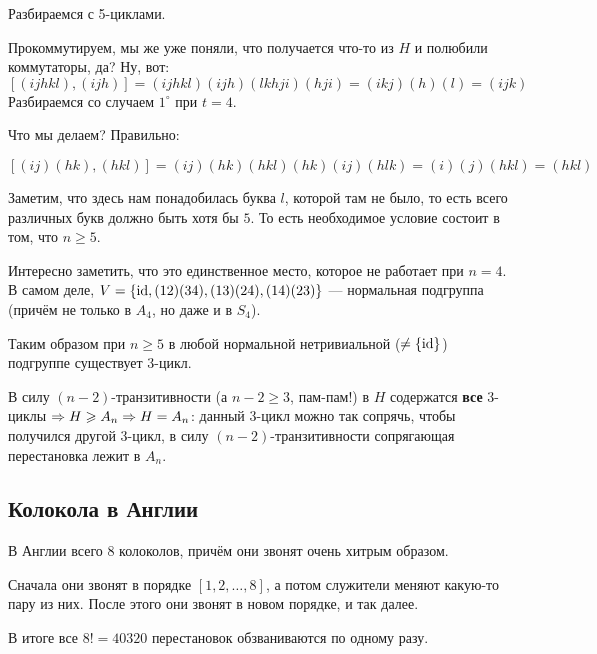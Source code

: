 \documentclass[a4paper]{report}
\begin{document}
{{{        }\ok
        Разбираемся с 5-циклами.

        Прокоммутируем, мы же уже поняли, что получается что-то из $H$ и полюбили коммутаторы, да? Ну, вот:
        \[[(ijhkl), (ijh)] = (ijhkl)(ijh)(lkhji)(hji)=(ikj)(h)(l) = (ijk)\]
        \ok
        Разбираемся со случаем $1^\circ$ при $t = 4$.

        Что мы делаем? Правильно:

        \[[(ij)(hk),(hkl)]=(ij)(hk)(hkl)(hk)(ij)(hlk)=(i)(j)(hkl) = (hkl)\]

        Заметим, что здесь нам понадобилась буква $l$, которой там не было, то есть всего различных букв должно быть хотя бы $5$.
        То есть необходимое условие состоит в том, что $n\ge 5$.

        Интересно заметить, что это единственное место, которое не работает при $n = 4$.
        В самом деле, $V = \{\operatorname{id}, (12)(34), (13)(24), (14)(23)\}$ --- нормальная подгруппа (причём не только в $A_4$, но даже и в $S_4$).

        \ok
        Таким образом при $n\ge 5$ в любой нормальной нетривиальной ($\ne \{\operatorname{id}\}$) подгруппе существует 3-цикл.

        В силу $(n-2)$-транзитивности (а $n-2\ge 3$, пам-пам!) в $H$ содержатся \textbf{все} 3-циклы $\Rightarrow H\geqslant A_n \Rightarrow H = A_n$: данный 3-цикл можно так сопрячь, чтобы получился другой 3-цикл, в силу $(n-2)$-транзитивности сопрягающая перестановка лежит в $A_n$.
    }
    }

    \subsection{Колокола в Англии}
    В Англии всего 8 колоколов, причём они звонят очень хитрым образом.

    Сначала они звонят в порядке $[1, 2, \dots, 8]$, а потом служители меняют какую-то пару из них.
    После этого они звонят в новом порядке, и так далее.

    В итоге все $8! = 40320$ перестановок обзваниваются по одному разу.
\end{document}

